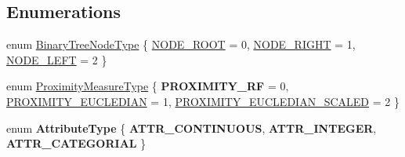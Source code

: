 \subsection*{Enumerations}
\begin{DoxyCompactItemize}
\item 
enum \hyperlink{namespaceffactory_a405b9095f0a093ae4770f7638f0eb730}{Binary\-Tree\-Node\-Type} \{ \hyperlink{namespaceffactory_a405b9095f0a093ae4770f7638f0eb730a80f4791740f2e7819cbbebffa5171d19}{N\-O\-D\-E\-\_\-\-R\-O\-O\-T} = 0, 
\hyperlink{namespaceffactory_a405b9095f0a093ae4770f7638f0eb730ad5fe1f87cc4d82b19e470c523b1d7056}{N\-O\-D\-E\-\_\-\-R\-I\-G\-H\-T} = 1, 
\hyperlink{namespaceffactory_a405b9095f0a093ae4770f7638f0eb730a44033b94a6fec357a0799951eadd50a8}{N\-O\-D\-E\-\_\-\-L\-E\-F\-T} = 2
 \}
\item 
enum \hyperlink{namespaceffactory_a4c245a9eacd4f260ee05929d46f1e3bb}{Proximity\-Measure\-Type} \{ {\bfseries P\-R\-O\-X\-I\-M\-I\-T\-Y\-\_\-\-R\-F} = 0, 
\hyperlink{namespaceffactory_a4c245a9eacd4f260ee05929d46f1e3bba43fde2e8007feef51e9110093911bdc8}{P\-R\-O\-X\-I\-M\-I\-T\-Y\-\_\-\-E\-U\-C\-L\-E\-D\-I\-A\-N} = 1, 
\hyperlink{namespaceffactory_a4c245a9eacd4f260ee05929d46f1e3bbac4ef1e16c7388f46d3a44047c34fa4bb}{P\-R\-O\-X\-I\-M\-I\-T\-Y\-\_\-\-E\-U\-C\-L\-E\-D\-I\-A\-N\-\_\-\-S\-C\-A\-L\-E\-D} = 2
 \}
\item 
enum {\bfseries Attribute\-Type} \{ {\bfseries A\-T\-T\-R\-\_\-\-C\-O\-N\-T\-I\-N\-U\-O\-U\-S}, 
{\bfseries A\-T\-T\-R\-\_\-\-I\-N\-T\-E\-G\-E\-R}, 
{\bfseries A\-T\-T\-R\-\_\-\-C\-A\-T\-E\-G\-O\-R\-I\-A\-L}
 \}
\end{DoxyCompactItemize}
